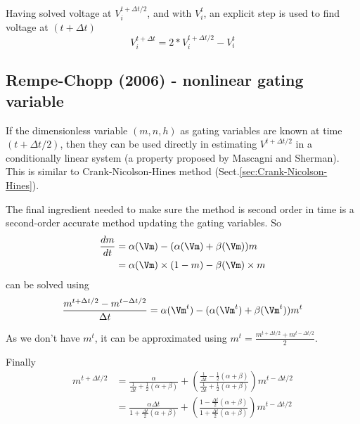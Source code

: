 Having solved voltage at $V_i^{t+\Delta t/2}$, and with $V_i^{t}$, an explicit
step is used to find voltage at $(t+\Delta t)$
\begin{equation}
V_i^{t+\Delta t} = 2 * V_i^{t+\Delta t/2} - V_i^{t}
\end{equation}

\subsection{Rempe-Chopp (2006) - nonlinear gating variable}
\label{sec:Rempe-Chopp-2006}

If the dimensionless variable $(m,n,h)$ as gating variables are known at time
$(t+\Delta t/2)$, then they can be used directly in estimating 
$V^{t+\Delta t/2}$ in a conditionally linear system (a property proposed by
Mascagni and Sherman).  This is similar to Crank-Nicolson-Hines method
(Sect.\ref{sec:Crank-Nicolson-Hines}).

The final ingredient needed to make sure the method is second order in time is a
second-order accurate method updating the gating variables. So
\begin{equation}
\begin{split}
\frac{dm}{dt} &= \alpha(\Vm)- (\alpha(\Vm) + \beta(\Vm)) m \\
 &= \alpha(\Vm) \times (1-m) - \beta(\Vm) \times m
\end{split}
\end{equation}
can be solved using
\begin{equation}
\frac{m^{t+\Delta t/2} - m^{t - \Delta t/2}}{\Delta t} = 
\alpha(\Vm^{t})-
(\alpha(\Vm^{t}) + \beta(\Vm^{t})) m^{t} 
\end{equation}

As we don't have $m^{t}$, it can be approximated using
$m^{t} = \frac{m^{t+\Delta t/2}+m^{t-\Delta t/2}}{2}$.

Finally
\begin{equation}
\begin{split}
m^{t+\Delta t/2} &= \frac{\alpha}{\frac{1}{\Delta t} + \frac{1}{2} (\alpha
+\beta)} + \left( \frac{\frac{1}{\Delta t} - \frac{1}{2} (\alpha
+\beta)}{\frac{1}{\Delta t} + \frac{1}{2} (\alpha
+\beta)} \right) m^{t-\Delta t/2}  \\
  &= \frac{\alpha \Delta t}{1 + \frac{\Delta t}{2} (\alpha
+\beta)} + \left( \frac{1 - \frac{\Delta t}{2} (\alpha
+\beta)}{1 + \frac{\Delta t}{2} (\alpha
+\beta)} \right) m^{t-\Delta t/2}
\end{split}
\end{equation}

